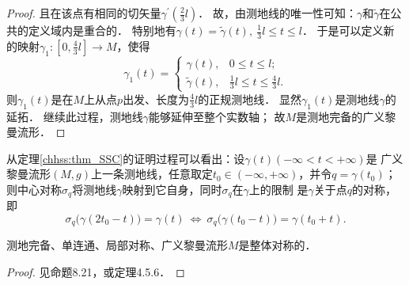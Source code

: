 \begin{proof}
    且在该点有相同的切矢量$\gamma^{\prime}(\frac{2}{3} l)$．
    故，由测地线的唯一性可知：$\gamma$和$\tilde{\gamma}$在公共的定义域内是重合的．
    特别地有$\gamma(t)=\tilde{\gamma}(t), \ \frac{1}{3} l \leqslant t \leqslant l $．
    于是可以定义新的映射$\gamma_1:\left[0, \frac{4}{3} l\right] \rightarrow M$，使得
    \begin{equation}\label{chhss:eqn_tmp-gd20}
        \gamma_1(t)=   \begin{cases} 
            \gamma(t), & 0 \leqslant t \leqslant l ; \\ 
            \tilde{\gamma}(t), & \frac{1}{3} l \leqslant t \leqslant \frac{4}{3} l .
        \end{cases}
    \end{equation}
    则$\gamma_1(t)$是在$M$上从点$p$出发、长度为$\frac{4}{3} l$的正规测地线．
    显然$\gamma_1(t)$是测地线$\gamma$的延拓．
    继续此过程，测地线$\gamma$能够延伸至整个实数轴；
    故$M$是测地完备的广义黎曼流形．
\end{proof}

从定理\ref{chhss:thm_SSC}的证明过程可以看出：设$\gamma(t)(-\infty < t< +\infty)$是
广义黎曼流形$(M,g)$上一条测地线，任意取定$t_0\in (-\infty , +\infty)$，并令$q=\gamma(t_0)$；
则中心对称$\sigma_q$将测地线$\gamma$映射到它自身，同时$\sigma_q$在$\gamma$上的限制
是$\gamma$关于点$q$的对称，即
\begin{equation}\label{chhss:eqn_geo-sym}
    \sigma_q\bigl(\gamma(2t_0- t)\bigr) = \gamma(t) \ \Leftrightarrow \
    \sigma_q\bigl(\gamma(t_0- t)\bigr) = \gamma(t_0+t) .
\end{equation}

\begin{proposition}\label{chhss:thm_l2g}
    测地完备、单连通、局部对称、广义黎曼流形$M$是整体对称的．
\end{proposition}
\begin{proof}
    见\parencite{oneill1983}命题8.21，或\parencite{helgason-2001}定理4.5.6．
\end{proof}


